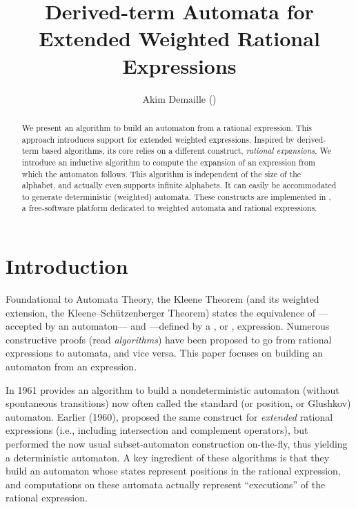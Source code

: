 \documentclass[a4paper,USenglish]{lipics}
\title{Derived-term Automata for\newline
  Extended Weighted Rational Expressions}
\author{Akim Demaille {\scriptsize (\SvnDate \SvnRev)}}
\affil{LRDE, EPITA, \texttt{akim@lrde.epita.fr}}
\begin{document}
\maketitle


\begin{abstract}
  We present an algorithm to build an automaton from a rational expression.
  This approach introduces support for extended weighted expressions.
  Inspired by derived-term based algorithms, its core relies on a different
  construct, \emph{rational expansions}.  We introduce an inductive
  algorithm to compute the expansion of an expression from which the
  automaton follows.  This algorithm is independent of the size of the
  alphabet, and actually even supports infinite alphabets.  It can easily be
  accommodated to generate deterministic (weighted) automata.  These
  constructs are implemented in \vcsn, a free-software platform dedicated to
  weighted automata and rational expressions.
\end{abstract}

\section{Introduction}

Foundational to Automata Theory, the Kleene Theorem (and its weighted
extension, the Kleene--Sch\"utzenberger Theorem) states the equivalence of
 ---accepted by an automaton--- and 
---defined by a , or , expression.  Numerous
constructive proofs (read \emph{algorithms}) have been proposed to go from
rational expressions to automata, and vice versa.  This paper focuses on
building an automaton from an expression.

In 1961 \citet{glushkov.61.rms} provides an algorithm to build a
nondeterministic automaton (without spontaneous transitions) now often
called the standard (or position, or Glushkov) automaton.
Earlier (1960), \citet{mcnaughton.60.itec} proposed the same construct for
\emph{extended} rational expressions (i.e., including intersection and
complement operators), but performed the now usual subset-automaton
construction on-the-fly, thus yielding a deterministic automaton.
A key ingredient of these algorithms is that they build an automaton whose
states represent positions in the rational expression, and computations on
these automata actually represent ``executions'' of the rational expression.
\end{document}
